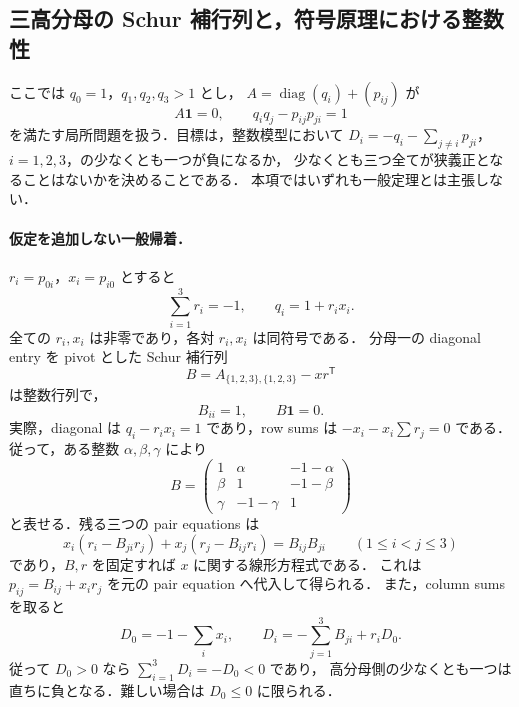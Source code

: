 \subsection{三高分母の Schur 補行列と，符号原理における整数性}
\label{nsch18:three-high}

ここでは $q_0=1$，$q_1,q_2,q_3>1$ とし，
$A=\operatorname{diag}(q_i)+(p_{ij})$ が
\[
 A\mathbf1=0,\qquad q_iq_j-p_{ij}p_{ji}=1
\]
を満たす局所問題を扱う．目標は，整数模型において
$D_i=-q_i-\sum_{j\ne i}p_{ji}$，$i=1,2,3$，の少なくとも一つが負になるか，
少なくとも三つ全てが狭義正となることはないかを決めることである．
本項ではいずれも一般定理とは主張しない．

\paragraph{仮定を追加しない一般帰着．}
$r_i=p_{0i}$，$x_i=p_{i0}$ とすると
\[
 \sum_{i=1}^3r_i=-1,\qquad q_i=1+r_ix_i.
\]
全ての $r_i,x_i$ は非零であり，各対 $r_i,x_i$ は同符号である．
分母一の diagonal entry を pivot とした Schur 補行列
\[
 B=A_{\{1,2,3\},\{1,2,3\}}-xr^{\mathsf T}
\]
は整数行列で，
\begin{equation}\label{nsch18:unit-diagonal}
 B_{ii}=1,\qquad B\mathbf1=0.
\end{equation}
実際，diagonal は $q_i-r_ix_i=1$ であり，row sums は
$-x_i-x_i\sum r_j=0$ である．従って，ある整数 $\alpha,\beta,\gamma$ により
\[
 B=\begin{pmatrix}
 1&\alpha&-1-\alpha\\
 \beta&1&-1-\beta\\
 \gamma&-1-\gamma&1
 \end{pmatrix}
\]
と表せる．残る三つの pair equations は
\begin{equation}\label{nsch18:linear-x}
 x_i(r_i-B_{ji}r_j)+x_j(r_j-B_{ij}r_i)=B_{ij}B_{ji}
 \qquad(1\leq i<j\leq3)
\end{equation}
であり，$B,r$ を固定すれば $x$ に関する線形方程式である．
これは $p_{ij}=B_{ij}+x_ir_j$ を元の pair equation へ代入して得られる．
また，column sums を取ると
\begin{equation}\label{nsch18:defect}
 D_0=-1-\sum_i x_i,\qquad
 D_i=-\sum_{j=1}^3B_{ji}+r_iD_0.
\end{equation}
従って $D_0>0$ なら $\sum_{i=1}^3D_i=-D_0<0$ であり，
高分母側の少なくとも一つは直ちに負となる．難しい場合は $D_0\leq0$ に限られる．

